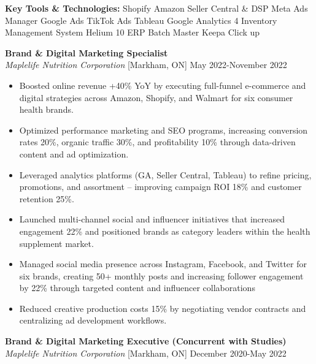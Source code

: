 \documentclass[10pt,letterpaper]{article}
\newcommand{\jobheader}[3]{\textit{#1} \hfill #2 \hfill #3}
\begin{document}
\textbf{Key Tools \& Technologies:} Shopify \textbar{} Amazon Seller Central \& DSP \textbar{} Meta Ads Manager \textbar{} Google Ads \textbar{} TikTok Ads \textbar{} Tableau \textbar{} Google Analytics 4 \textbar{} Inventory Management System \textbar{} Helium 10 \textbar{} ERP \textbar{} Batch Master \textbar{} Keepa \textbar{} Click up

\vspace{6pt}

\textbf{Brand \& Digital Marketing Specialist}\\
\jobheader{Maplelife Nutrition Corporation}{[Markham, ON]}{May 2022-November 2022}

\begin{itemize}
\item Boosted online revenue +40\% YoY by executing full-funnel e-commerce and digital strategies across Amazon, Shopify, and Walmart for six consumer health brands.
\item Optimized performance marketing and SEO programs, increasing conversion rates 20\%, organic traffic 30\%, and profitability 10\% through data-driven content and ad optimization.
\item Leveraged analytics platforms (GA, Seller Central, Tableau) to refine pricing, promotions, and assortment – improving campaign ROI 18\% and customer retention 25\%.
\item Launched multi-channel social and influencer initiatives that increased engagement 22\% and positioned brands as category leaders within the health supplement market.
\item Managed social media presence across Instagram, Facebook, and Twitter for six brands, creating 50+ monthly posts and increasing follower engagement by 22\% through targeted content and influencer collaborations
\item Reduced creative production costs 15\% by negotiating vendor contracts and centralizing ad development workflows.
\end{itemize}

\vspace{6pt}

\textbf{Brand \& Digital Marketing Executive (Concurrent with Studies)}\\
\jobheader{Maplelife Nutrition Corporation}{[Markham, ON]}{December 2020-May 2022}
\end{document}
